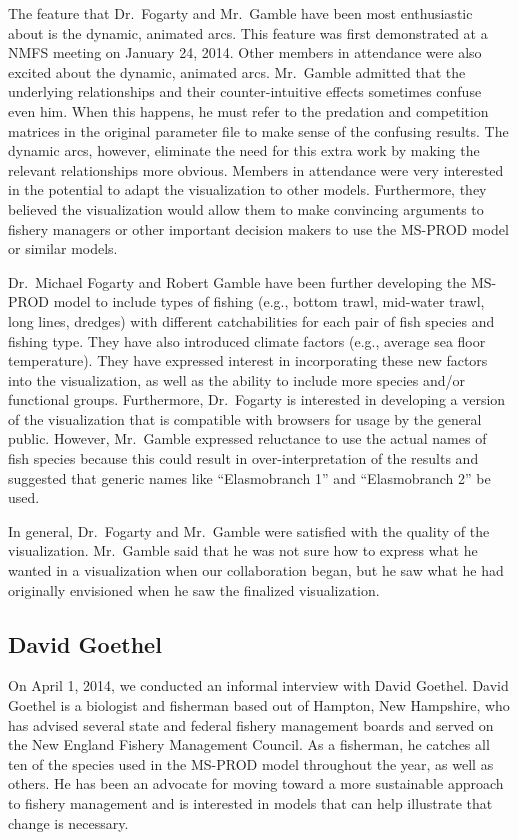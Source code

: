 The feature that Dr.\ Fogarty and Mr.\ Gamble have been most enthusiastic about is the dynamic, animated arcs.  This feature was first demonstrated at a NMFS meeting on January 24, 2014.  Other members in attendance were also excited about the dynamic, animated arcs.  Mr.\ Gamble admitted that the underlying relationships and their counter-intuitive effects sometimes confuse even him.  When this happens, he must refer to the predation and competition matrices in the original parameter file to make sense of the confusing results.  The dynamic arcs, however, eliminate the need for this extra work by making the relevant relationships more obvious.  Members in attendance were very interested in the potential to adapt the visualization to other models.  Furthermore, they believed the visualization would allow them to make convincing arguments to fishery managers or other important decision makers to use the MS-PROD model or similar models.

Dr.\ Michael Fogarty and Robert Gamble have been further developing the MS-PROD model to include types of fishing (e.g., bottom trawl, mid-water trawl, long lines, dredges) with different catchabilities for each pair of fish species and fishing type.  They have also introduced climate factors (e.g., average sea floor temperature).  They have expressed interest in incorporating these new factors into the visualization, as well as the ability to include more species and/or functional groups.  Furthermore, Dr.\ Fogarty is interested in developing a version of the visualization that is compatible with browsers for usage by the general public.  However, Mr.\ Gamble expressed reluctance to use the actual names of fish species because this could result in over-interpretation of the results and suggested that generic names like ``Elasmobranch 1'' and ``Elasmobranch 2'' be used.

In general, Dr.\ Fogarty and Mr.\ Gamble were satisfied with the quality of the visualization.  Mr.\ Gamble said that he was not sure how to express what he wanted in a visualization when our collaboration began, but he saw what he had originally envisioned when he saw the finalized visualization.  

\subsection{David Goethel}

On April 1, 2014, we conducted an informal interview with David Goethel.  David Goethel is a biologist and fisherman based out of Hampton, New Hampshire, who has advised several state and federal fishery management boards and served on the New England Fishery Management Council.  As a fisherman, he catches all ten of the species used in the MS-PROD model throughout the year, as well as others.  He has been an advocate for moving toward a more sustainable approach to fishery management and is interested in models that can help illustrate that change is necessary.  

